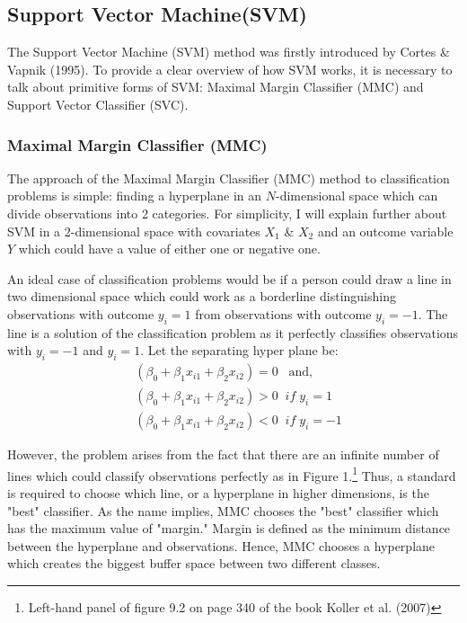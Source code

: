 \documentclass[11pt,a4paper,oneside]{article}
\begin{document}
\subsection{Support Vector Machine(SVM)}
The Support Vector Machine (SVM) method was firstly introduced by Cortes \& Vapnik (1995).\cite{cortes1995support} To provide a clear overview of how SVM works, it is necessary to talk about primitive forms of SVM: Maximal Margin Classifier (MMC) and Support Vector Classifier (SVC). 
\subsubsection{Maximal Margin Classifier (MMC)}
The approach of the Maximal Margin Classifier (MMC) method to classification problems is simple: finding a hyperplane in an $N$-dimensional space which can divide observations into 2 categories. For simplicity, I will explain further about SVM in a 2-dimensional space with covariates $X_{1}$ \& $X_{2}$ and an outcome variable $Y$ which could have a value of either one or negative one. 
\par
An ideal case of classification problems would be if a person could draw a line in two dimensional space which could work as a borderline distinguishing observations with outcome $y_{i}=1$ from observations with outcome $y_{i}=-1$. The line is a solution of the classification problem as it perfectly classifies observations with $y_{i}=-1$ and $y_{i}=1$. Let the separating hyper plane be:
\begin{align}
    & (\beta_{0}+\beta_{1}x_{i1}+\beta_{2}x_{i2}) = 0 \;\;\; \text{and,}\\
    & (\beta_{0}+\beta_{1}x_{i1}+\beta_{2}x_{i2}) > 0 \;\;if\; y_{i} = 1\\
    & (\beta_{0}+\beta_{1}x_{i1}+\beta_{2}x_{i2}) < 0 \;\;if\; y_{i} = -1
\end{align}
\par
However, the problem arises from the fact that there are an infinite number of lines which could classify observations perfectly as in Figure 1.\footnote{Left-hand panel of figure 9.2 on page 340 of the book Koller et al. (2007)\cite{koller2007introduction}} Thus, a standard is required to choose which line, or a hyperplane in higher dimensions, is the "best" classifier. As the name implies, MMC chooses the "best" classifier which has the maximum value of "margin." Margin is defined as the minimum  distance between the hyperplane and observations. Hence, MMC chooses a hyperplane which creates the biggest buffer space between two different classes.
\end{document}

